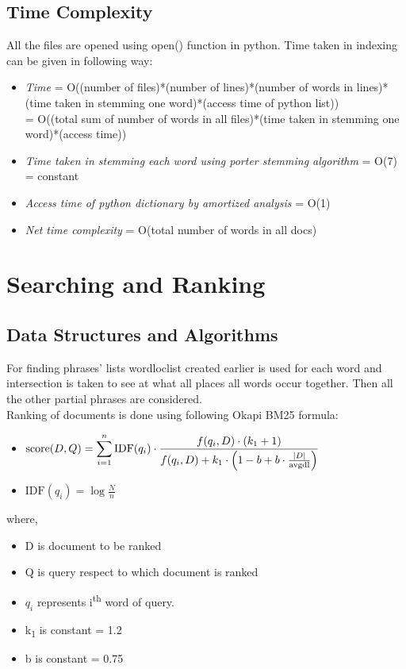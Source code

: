 \documentclass[12pt]{article}
\begin{document}
\subsection{Time Complexity}
All the files are opened using open() function in python. Time taken in indexing can be given in following way:\\
\begin{itemize}
\item[]\textit{Time} = O((number of files)*(number of lines)*(number of words in lines)*(time taken in stemming one word)*(access time of python list))\\
= O((total sum of number of words in all files)*(time taken in stemming one word)*(access time)) 
\item[]\textit{Time taken in stemming each word using porter stemming algorithm} = O(7) = constant
\item[]\textit{Access time of python dictionary by amortized analysis} = O(1)
\item[]\textit{Net time complexity} = O(total number of words in all docs)
\end{itemize}


\section{Searching and Ranking}
\subsection{Data Structures and Algorithms}
For finding phrases' lists wordloclist created earlier is used for each word and intersection is taken to see at what all places all words occur together. Then all the other partial phrases are considered.\\
Ranking of documents is done using following Okapi BM25 formula:
\begin{itemize}
\item[] $\displaystyle {\text{score}}(D,Q)=\sum _{i=1}^{n}{\text{IDF}}(q_{i})\cdot {\frac {f(q_{i},D)\cdot (k_{1}+1)}{f(q_{i},D)+k_{1}\cdot \left(1-b+b\cdot {\frac {|D|}{\text{avgdl}}}\right)}}\\$
\item[] $\text{IDF}(q_i) = \log \frac{N}{n}$
\end{itemize}

where,
\begin{itemize}
\item[]D is document to be ranked
\item[]Q is query respect to which document is ranked 
\item[]$q_{i}$ represents i\textsuperscript{th}  word of query.
\item[]k\textsubscript{1} is constant = 1.2
\item[]b is constant = 0.75
\end{itemize}
\end{document}
